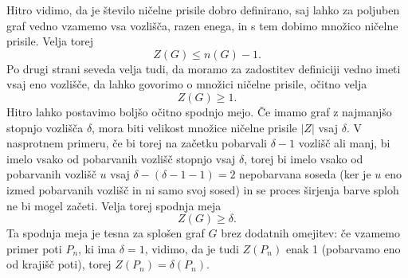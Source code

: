 \documentclass[12pt,a4paper,twoside]{article}
\theoremstyle{definition} %
\theoremstyle{plain} %
\numberwithin{equation}{section}  %
\begin{document}
Hitro vidimo, da je število ničelne prisile dobro definirano, saj lahko za poljuben graf vedno vzamemo vsa vozlišča, razen enega, in s tem dobimo množico ničelne prisile. Velja torej
\begin{equation}
    Z(G) \leq n(G) - 1.
    \label{eq:trv-zgornja-meja}
\end{equation}
Po drugi strani seveda velja tudi, da moramo za zadostitev definiciji vedno imeti vsaj eno vozlišče, da lahko govorimo o množici ničelne prisile, očitno velja
\begin{equation}
Z(G)  \geq 1.
\label{eq:trv-trv-spodnja-meja}
\end{equation}
Hitro lahko postavimo boljšo očitno spodnjo mejo. Če imamo graf z najmanjšo stopnjo vozlišča $\delta$, mora biti velikost množice ničelne prisile $|Z|$ vsaj $\delta$. V nasprotnem primeru, če bi torej na začetku pobarvali $\delta - 1$ vozlišč ali manj, bi imelo vsako od pobarvanih vozlišč stopnjo vsaj $\delta$, torej bi imelo vsako od pobarvanih vozlišč $u$ vsaj $\delta - (\delta - 1 - 1) = 2$ nepobarvana soseda (ker je $u$ eno izmed pobarvanih vozlišč in ni samo svoj sosed) in se proces širjenja barve sploh ne bi mogel začeti. Velja torej spodnja meja
\begin{equation}
    Z(G) \geq \delta.
    \label{eq:trv-spodnja-meja}
\end{equation}
Ta spodnja meja je tesna za splošen graf $G$ brez dodatnih omejitev: če vzamemo primer poti $P_n$, ki ima $\delta = 1$, vidimo, da je tudi $Z(P_n)$ enak 1 (pobarvamo eno od krajišč poti), torej $Z(P_n) = \delta(P_n).$
\end{document}
